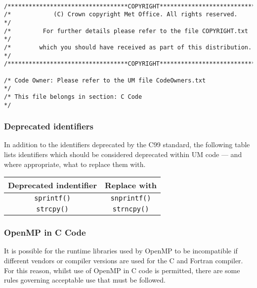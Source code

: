 \begin{minipage}{\linewidth}
\begin{verbatim}

/**********************************COPYRIGHT***********************************/
/*            (C) Crown copyright Met Office. All rights reserved.            */
/*         For further details please refer to the file COPYRIGHT.txt         */
/*        which you should have received as part of this distribution.        */
/**********************************COPYRIGHT***********************************/

/* Code Owner: Please refer to the UM file CodeOwners.txt                     */
/* This file belongs in section: C Code                                       */

\end{verbatim}
\end{minipage}

\subsubsection{Deprecated identifiers}
In addition to the identifiers deprecated by the C99 standard, the following table lists identifiers which should be considered deprecated within UM code --- and where appropriate, what to replace them with.

\addtocounter{footnote}{1}
\begin{tabular}{|c|c|} \hline
\bf{Deprecated indentifier} & \bf{Replace with} \\ \hline
\verb|sprintf()| & \verb|snprintf()|\footnotemark[\value{footnote}] \\ \hline
\verb|strcpy()| & \verb|strncpy()|\footnotemark[\value{footnote}] \\ \hline
\end{tabular}

\subsubsection{OpenMP in C Code}\label{sec:OpenMPinC}
It is possible for the runtime libraries used by OpenMP to be incompatible if different vendors or compiler versions are used for
the C and Fortran compiler. For this reason, whilst use of OpenMP in C code is permitted, there are some rules governing acceptable
use that must be followed.

